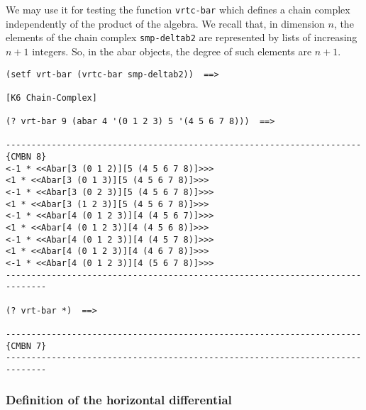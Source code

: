 We may use it for testing the function {\tt vrtc-bar} which defines a chain complex
independently of the product of the algebra. We recall that, in dimension $n$, the elements
of the chain complex {\tt smp-deltab2} are represented by lists of increasing $n+1$  integers. So, in the abar objects,
the degree of such elements are $n+1$.
{\footnotesize\begin{verbatim}
(setf vrt-bar (vrtc-bar smp-deltab2))  ==>

[K6 Chain-Complex]

(? vrt-bar 9 (abar 4 '(0 1 2 3) 5 '(4 5 6 7 8)))  ==>

----------------------------------------------------------------------{CMBN 8}
<-1 * <<Abar[3 (0 1 2)][5 (4 5 6 7 8)]>>>
<1 * <<Abar[3 (0 1 3)][5 (4 5 6 7 8)]>>>
<-1 * <<Abar[3 (0 2 3)][5 (4 5 6 7 8)]>>>
<1 * <<Abar[3 (1 2 3)][5 (4 5 6 7 8)]>>>
<-1 * <<Abar[4 (0 1 2 3)][4 (4 5 6 7)]>>>
<1 * <<Abar[4 (0 1 2 3)][4 (4 5 6 8)]>>>
<-1 * <<Abar[4 (0 1 2 3)][4 (4 5 7 8)]>>>
<1 * <<Abar[4 (0 1 2 3)][4 (4 6 7 8)]>>>
<-1 * <<Abar[4 (0 1 2 3)][4 (5 6 7 8)]>>>
------------------------------------------------------------------------------

(? vrt-bar *)  ==>

----------------------------------------------------------------------{CMBN 7}
------------------------------------------------------------------------------
\end{verbatim}}

\subsubsection {Definition of the horizontal differential}

